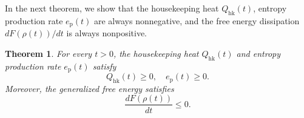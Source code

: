 \documentclass[10pt]{article}
\newtheorem{thm}{Theorem}[section]
\theoremstyle{definition}
\numberwithin{equation}{section}
\begin{document}
In the next theorem, we show that the housekeeping heat $Q_\mathrm{hk}(t)$, entropy production rate $e_\mathrm{p}(t)$ are always nonnegative, and the free energy dissipation $dF(\rho(t))/dt$ is always nonpositive.

\begin{thm}
For every $t>0$, the housekeeping heat $Q_\mathrm{hk}(t)$ and entropy production rate $e_\mathrm{p}(t)$ satisfy
\begin{equation*}
    Q_\mathrm{hk}(t) \geq 0, \quad e_\mathrm{p}(t) \geq 0.
\end{equation*}
Moreover, the generalized free energy satisfies
\begin{equation*}
    \frac{dF(\rho(t))}{dt} \leq 0.
\end{equation*}
\end{thm}
\end{document}
